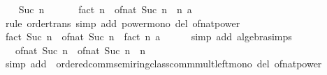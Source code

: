 \begin{isabellebody}
\isanewline
\ \ \isamarkupfalse%
\ {\isacharparenleft}{\kern0pt}Suc\ n{\isacharparenright}{\kern0pt}\isanewline
\ \ \isamarkupfalse%
\ \isamarkupfalse%
\ {\isacharasterisk}{\kern0pt}{\isacharcolon}{\kern0pt}\ {\isachardoublequoteopen}fact\ n\ {\isasymle}\ {\isacharparenleft}{\kern0pt}of{\isacharunderscore}{\kern0pt}nat\ {\isacharparenleft}{\kern0pt}Suc\ n\ {\isacharcircum}{\kern0pt}\ n{\isacharparenright}{\kern0pt}\ {\isacharcolon}{\kern0pt}{\isacharcolon}{\kern0pt}{\isacharprime}{\kern0pt}a{\isacharparenright}{\kern0pt}{\isachardoublequoteclose}\isanewline
\ \ \ \ \isamarkupfalse%
\ {\isacharparenleft}{\kern0pt}rule\ order{\isacharunderscore}{\kern0pt}trans{\isacharparenright}{\kern0pt}\ {\isacharparenleft}{\kern0pt}simp\ add{\isacharcolon}{\kern0pt}\ power{\isacharunderscore}{\kern0pt}mono\ del{\isacharcolon}{\kern0pt}\ of{\isacharunderscore}{\kern0pt}nat{\isacharunderscore}{\kern0pt}power{\isacharparenright}{\kern0pt}\isanewline
\ \ \isamarkupfalse%
\ {\isachardoublequoteopen}fact\ {\isacharparenleft}{\kern0pt}Suc\ n{\isacharparenright}{\kern0pt}\ {\isacharequal}{\kern0pt}\ {\isacharparenleft}{\kern0pt}of{\isacharunderscore}{\kern0pt}nat\ {\isacharparenleft}{\kern0pt}Suc\ n{\isacharparenright}{\kern0pt}\ {\isacharasterisk}{\kern0pt}\ fact\ n\ {\isacharcolon}{\kern0pt}{\isacharcolon}{\kern0pt}{\isacharprime}{\kern0pt}a{\isacharparenright}{\kern0pt}{\isachardoublequoteclose}\isanewline
\ \ \ \ \isamarkupfalse%
\ {\isacharparenleft}{\kern0pt}simp\ add{\isacharcolon}{\kern0pt}\ algebra{\isacharunderscore}{\kern0pt}simps{\isacharparenright}{\kern0pt}\isanewline
\ \ \isamarkupfalse%
\ \isamarkupfalse%
\ {\isachardoublequoteopen}{\isasymdots}\ {\isasymle}\ of{\isacharunderscore}{\kern0pt}nat\ {\isacharparenleft}{\kern0pt}Suc\ n{\isacharparenright}{\kern0pt}\ {\isacharasterisk}{\kern0pt}\ of{\isacharunderscore}{\kern0pt}nat\ {\isacharparenleft}{\kern0pt}Suc\ n\ {\isacharcircum}{\kern0pt}\ n{\isacharparenright}{\kern0pt}{\isachardoublequoteclose}\isanewline
\ \ \ \ \isamarkupfalse%
\ {\isacharparenleft}{\kern0pt}simp\ add{\isacharcolon}{\kern0pt}\ {\isacharasterisk}{\kern0pt}\ ordered{\isacharunderscore}{\kern0pt}comm{\isacharunderscore}{\kern0pt}semiring{\isacharunderscore}{\kern0pt}class{\isachardot}{\kern0pt}comm{\isacharunderscore}{\kern0pt}mult{\isacharunderscore}{\kern0pt}left{\isacharunderscore}{\kern0pt}mono\ del{\isacharcolon}{\kern0pt}\ of{\isacharunderscore}{\kern0pt}nat{\isacharunderscore}{\kern0pt}power{\isacharparenright}{\kern0pt}\isanewline

\end{isabellebody}
